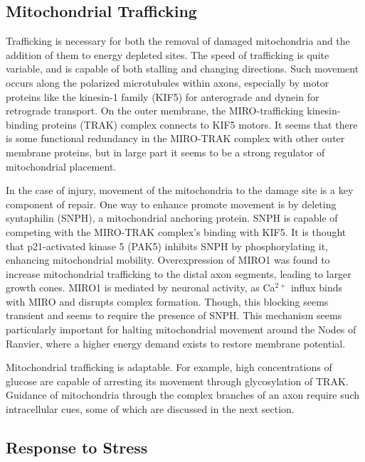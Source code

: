 \documentclass[12pt]{report}
\begin{document}
\subsection{Mitochondrial Trafficking}

Trafficking is necessary for both the removal of damaged mitochondria and the addition of them to energy depleted sites. The speed of trafficking is quite variable, and is capable of both stalling and changing directions. Such movement occurs along the polarized microtubules within axons, especially by motor proteins like the kinesin-1 family (KIF5) for anterograde and dynein for retrograde transport. On the outer membrane, the MIRO-trafficking kinesin-binding proteins (TRAK) complex connects to KIF5 motors. It seems that there is some functional redundancy in the MIRO-TRAK complex with other outer membrane proteins, but in large part it seems to be a strong regulator of mitochondrial placement.\newline

In the case of injury, movement of the mitochondria to the damage site is a key component of repair. One way to enhance promote movement is by deleting syntaphilin (SNPH), a mitochondrial anchoring protein. SNPH is capable of competing with the MIRO-TRAK complex's binding with KIF5. It is thought that p21-activated kinase 5 (PAK5) inhibits SNPH by phosphorylating it, enhancing mitochondrial mobility. Overexpression of MIRO1 was found to increase mitochondrial trafficking to the distal axon segments, leading to larger growth cones. MIRO1 is mediated by neuronal activity, as Ca$^{2+}$ influx binds with MIRO and disrupts complex formation. Though, this blocking seems transient and seems to require the presence of SNPH. This mechanism seems particularly important for halting mitochondrial movement around the Nodes of Ranvier, where a higher energy demand exists to restore membrane potential.\newline

Mitochondrial trafficking is adaptable. For example, high concentrations of glucose are capable of arresting its movement through glycosylation of TRAK. Guidance of mitochondria through the complex branches of an axon require such intracellular cues, some of which are discussed in the next section.  

\subsection{Response to Stress}
\end{document}
